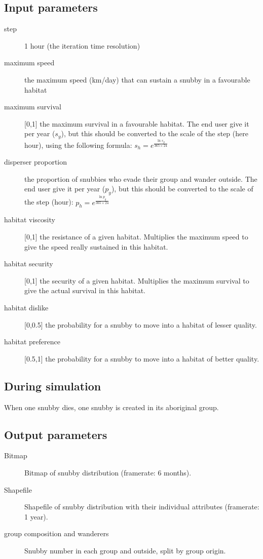 \subsection{Input parameters}
\begin{description}
	\item[step] 1 hour (the iteration time resolution)
	\item[maximum speed] the maximum speed (km/day) that can sustain a snubby in a favourable habitat
	\item[maximum survival]  [0,1] the maximum survival in a favourable habitat. The end user give it per year ($s_y$), but this should be converted to the scale of the step (here hour), using the following formula: $s_h=e^{\frac{\ln{s_y}}{365\times24}}$
	\item[disperser proportion] the proportion of snubbies who evade their group and wander outside. The end user give it per year  ($p_y$), but this should be converted to the scale of the step (hour): $p_h=e^{\frac{\ln{p_y}}{365\times24}}$
	\item[habitat viscosity] [0,1] the resistance of a given habitat.  Multiplies the maximum speed to give the speed really sustained in this habitat.
	\item[habitat security] [0,1] the security of a given habitat.  Multiplies the maximum survival to give the actual survival in this habitat.
	\item[habitat dislike] [0,0.5] the probability for a snubby to move into a habitat of lesser quality.
	\item[habitat preference] [0.5,1] the probability for a snubby to move into a habitat of better quality.
	
\end{description}

\subsection{During simulation}
When one snubby dies, one snubby is created in its aboriginal group.


\subsection{Output parameters}

\begin{description}
	\item[Bitmap] Bitmap of snubby distribution (framerate: 6 months).
	\item[Shapefile] Shapefile of snubby distribution with their individual attributes (framerate: 1 year).
	\item[group composition and wanderers] Snubby number in each group and outside, split by group origin.
	
\end{description}





